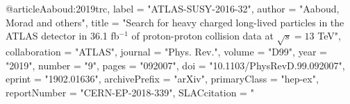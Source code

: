 @article{Aaboud:2019trc,
      label          = "ATLAS-SUSY-2016-32",
      author         = "Aaboud, Morad and others",
      title          = "{Search for heavy charged long-lived particles in the
                        ATLAS detector in 36.1 fb$^{-1}$ of proton-proton
                        collision data at $\sqrt{s} = 13$ TeV}",
      collaboration  = "ATLAS",
      journal        = "Phys. Rev.",
      volume         = "D99",
      year           = "2019",
      number         = "9",
      pages          = "092007",
      doi            = "10.1103/PhysRevD.99.092007",
      eprint         = "1902.01636",
      archivePrefix  = "arXiv",
      primaryClass   = "hep-ex",
      reportNumber   = "CERN-EP-2018-339",
      SLACcitation   = "%
}

